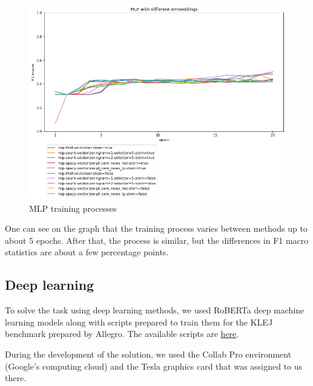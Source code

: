 \documentclass[a4paper]{article}
\begin{document}
\begin{figure}[h]
\centering
\includegraphics[width=\textwidth]{plots/mlp_with_different_embeddings_comparison.png}
\caption{MLP training processes}
\label{fig:mlp_training}
\end{figure}

One can see on the graph that the training process varies between methods up to about 5 epochs. After that, the process is similar, but the differences in F1 macro statistics are about a few percentage points.

\subsection{Deep learning}

To solve the task using deep learning methods, we used RoBERTa deep machine learning models along with scripts prepared to train them for the KLEJ benchmark prepared by Allegro. The available scripts are \href{https://github.com/sdadas/polish-roberta}{here}. 

During the development of the solution, we used the Collab Pro environment (Google's computing cloud) and the Tesla graphics card that was assigned to us there.
\end{document}
